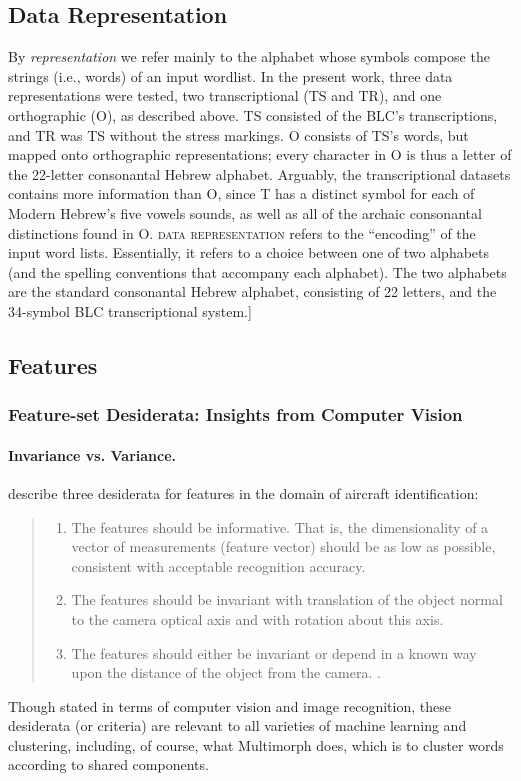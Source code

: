 \subsection {Data Representation} 
\label{sec:datarep}
By \emph{representation} we refer mainly to the alphabet whose 
symbols compose the strings (i.e., words) 
of an input wordlist.
In the present work, three data representations were tested, two transcriptional 
(TS and TR), and one orthographic (O), as described above.
TS consisted of the BLC's transcriptions, and TR was TS without the stress markings. 
O consists of TS's words, but mapped onto orthographic 
representations; every character in O is thus
a letter of the 22-letter consonantal Hebrew alphabet.
Arguably, the transcriptional datasets contains more information than O,
since T has a distinct symbol for each of Modern Hebrew's five vowels sounds,
as well as all of the archaic consonantal distinctions found in O. 
\textsc{data representation} refers to the ``encoding'' of the input
word lists. Essentially, it refers to a choice between one of two alphabets (and the spelling conventions that 
accompany each alphabet). The two alphabets are the standard consonantal Hebrew alphabet, consisting of 22 letters,
and the 34-symbol \ac{BLC} transcriptional system.]

\subsection{Features}   %
\label{sec:features}

\subsubsection{Feature-set Desiderata: Insights from Computer Vision}
\paragraph{Invariance vs. Variance.}
\cite{dudani-et-al:1977} describe three desiderata for features in the 
domain of aircraft identification:
\begin{quote}
\begin{enumerate}
\item The features should be informative. That is, the dimensionality of a 
vector of measurements (feature vector) should be as low as possible, 
consistent with acceptable recognition accuracy.
\item The features should be invariant with translation of the object 
normal to the camera optical axis and with rotation about this axis.
\item The features should either be invariant or depend in a known 
way upon the distance of the object from the camera.
\citep[][p. 40]{dudani-et-al:1977}.
\end{enumerate}
\end{quote}
Though stated in terms of computer vision and image recognition, 
these desiderata (or criteria) are relevant to all varieties of machine 
learning and clustering, including, of course, what Multimorph does, which is to
cluster words according to shared components.

